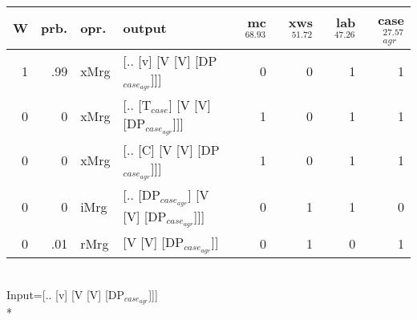 \begin{tabularx}{\linewidth}{rrlXrrrr}
\hline
   W &   prb. & opr.   & output                                   &   mc$^{68.93}$ &   xws$^{51.72}$ &   lab$^{47.26}$ &   case$_{agr}^{27.57}$ \\
\hline
   1 &   .99 & xMrg & [.. [v] [V [V] [DP$_{case_{agr}}$]]]           &            0 &             0 &             1 &                  1 \\
   0 &   0 & xMrg & [.. [T$_{case}$] [V [V] [DP$_{case_{agr}}$]]]      &            1 &             0 &             1 &                  1 \\
   0 &   0 & xMrg & [.. [C] [V [V] [DP$_{case_{agr}}$]]]           &            1 &             0 &             1 &                  1 \\
   0 &   0 & iMrg & [.. [DP$_{case_{agr}}$] [V [V] [DP$_{case_{agr}}$]]] &            0 &             1 &             1 &                  0 \\
   0 &   .01 & rMrg & [V [V] [DP$_{case_{agr}}$]]                    &            0 &             1 &             0 &                  1 \\
\hline
\end{tabularx}\endgroup\\
\begingroup\scriptsize Input=[.. [v] [V [V] [DP$_{case_{agr}}$]]]\\*
